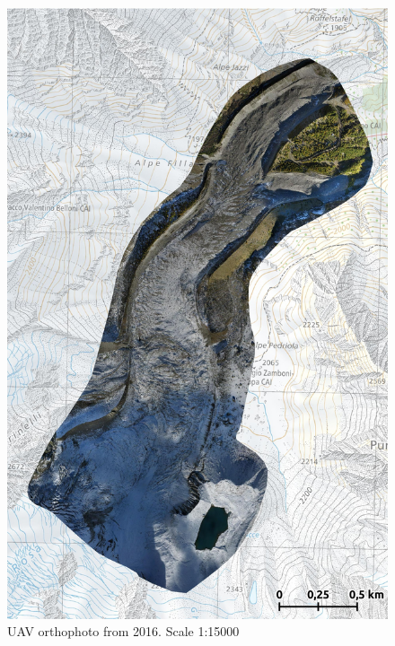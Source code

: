 \begin{figure}[p]
    \centering
    \includegraphics[width=\textwidth]{figures/appendix/orto_2016.jpg}
    \caption{UAV orthophoto from 2016. Scale 1:15000}
\end{figure}

